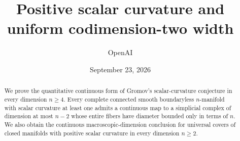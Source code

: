 \documentclass[11pt]{article}
\title{Positive scalar curvature and uniform codimension-two width}
\author{OpenAI}
\date{September 23, 2026}
\numberwithin{equation}{section}
\theoremstyle{definition}
\theoremstyle{remark}
\begin{document}
\maketitle
\begin{abstract}
We prove the quantitative continuous form of Gromov's scalar-curvature
conjecture in every dimension $n\ge4$. Every complete connected smooth
boundaryless $n$-manifold with scalar curvature at least one admits a
continuous map to a simplicial complex of dimension at most $n-2$ whose
entire fibers have diameter bounded only in terms of $n$. We also obtain
the continuous macroscopic-dimension conclusion for
universal covers of closed manifolds with positive scalar curvature in
every dimension $n\ge2$.
\end{abstract}
\begingroup\small\tableofcontents\endgroup
\clearpage









\appendix





\clearpage
{}
{}
\begingroup\raggedright


\endgroup
\end{document}
